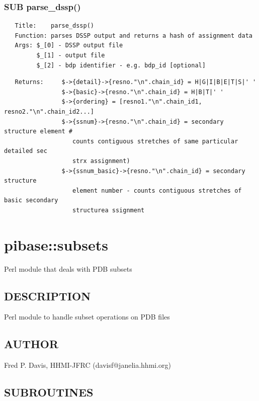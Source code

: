 \documentclass{article}
\begin{document}
\subsubsection*{SUB parse\_dssp()\label{pibase::PDB::sec_strx_SUB_parse_dssp_}}
\begin{verbatim}
   Title:    parse_dssp()
   Function: parses DSSP output and returns a hash of assignment data
   Args: $_[0] - DSSP output file
         $_[1] - output file
         $_[2] - bdp identifier - e.g. bdp_id [optional]
\end{verbatim}
\begin{verbatim}
   Returns:     $->{detail}->{resno."\n".chain_id} = H|G|I|B|E|T|S|' '
                $->{basic}->{resno."\n".chain_id} = H|B|T|' '
                $->{ordering} = [resno1."\n".chain_id1, resno2."\n".chain_id2...]
                $->{ssnum}->{resno."\n".chain_id} = secondary structure element #
                   counts contiguous stretches of same particular detailed sec
                   strx assignment)
                $->{ssnum_basic}->{resno."\n".chain_id} = secondary structure
                   element number - counts contiguous stretches of basic secondary
                   structurea ssignment
\end{verbatim}
\clearpage
\section{pibase::subsets\label{pibase::subsets}}


Perl module that deals with PDB subsets

\subsection*{DESCRIPTION\label{pibase::subsets_DESCRIPTION}}


Perl module to handle subset operations on PDB files

\subsection*{AUTHOR\label{pibase::subsets_AUTHOR}}


Fred P. Davis, HHMI-JFRC (davisf@janelia.hhmi.org)

\subsection*{SUBROUTINES\label{pibase::subsets_SUBROUTINES}}
\end{document}
